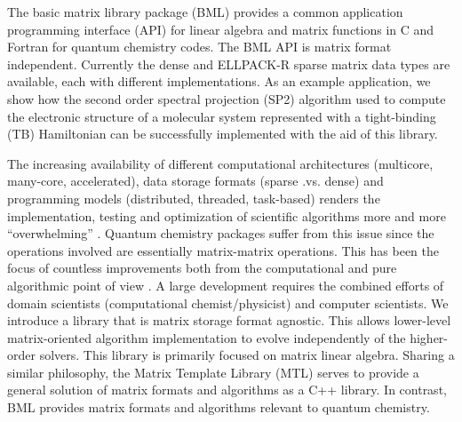 
\def\bml#1{\texttt{\color{blue} #1}}  %
\newcommand*\mycommand[1]{\texttt{\emph{#1}}}
\newcommand{\bra}[1]{\langle #1 |}
\newcommand{\ket}[1]{| #1 \rangle}
\newcommand{\braket}[2]{\langle #1 | #2 \rangle}
\newcommand{\spec}[1]{\langle #1 \rangle}
\newcommand{\icomp}{\mathrm{i}}
\newcommand{\tr}{\mathrm{Tr}}
\newcommand{\norm}[1]{\Vert #1 \Vert}
\newcommand{\fer}{\mathrm{f}}
\newcommand{\emin}{\epsilon_{\mathrm{min}}}
\newcommand{\emax}{\epsilon_{\mathrm{max}}}  
\newcommand{\p}{\textbf{P}}
\newcommand{\pno}{\textbf{P}}
\newcommand{\HH}{\textbf{H}}  
\newcommand{\ham}{\textbf{H}}
\newcommand{\X}{\textbf{X}}
\newcommand{\Id}{\textbf{I}}
\newcommand{\B}{\textbf{B}}
\newcommand{\SSS}{\textbf{S}}
\newcommand{\C}{\textbf{C}}
\newcommand{\Z}{\textbf{Z}}


  The basic matrix library package (BML) provides a common application programming interface (API) for linear algebra and matrix functions in C and Fortran for quantum chemistry codes. The BML API is matrix format independent. Currently the dense and ELLPACK-R sparse matrix data types are available, each with different implementations. As an example application, we show how the second order spectral projection (SP2) algorithm used to compute the electronic structure of a molecular system represented with a tight-binding (TB) Hamiltonian can be successfully implemented with the aid of this library. 

The increasing availability of different computational architectures (multicore, many-core, accelerated), data storage formats (sparse .vs. dense) and programming models (distributed, threaded, task-based) renders the implementation, testing and optimization of scientific algorithms more and more ``overwhelming'' \cite{Merali2010}. Quantum chemistry packages suffer from this issue since the operations involved are essentially matrix-matrix operations. This has been the focus of countless improvements both from the computational and pure algorithmic point of view \cite{watkins2010}. 
A large development requires the combined efforts of domain scientists (computational chemist/physicist) and computer scientists. 
%
We introduce a library that is matrix storage format agnostic.
This allows lower-level matrix-oriented algorithm implementation to evolve independently of the higher-order solvers. 
This library is primarily focused on matrix linear algebra.
Sharing a similar philosophy, the Matrix Template Library (MTL) \cite{mtl} serves to provide a general solution of matrix formats and algorithms as a C++ library. In contrast, BML provides matrix formats and algorithms relevant to quantum chemistry.

